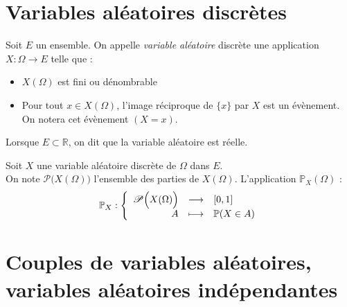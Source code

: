 \documentclass[11pt,a4paper,fleqn,pdftex]{report}
\begin{document}
\section{Variables aléatoires discrètes} %
\label{sec:variables_aleatoires_discretes}
\begin{dfn}
     Soit $E$ un ensemble. On appelle \emph{variable aléatoire} discrète une application $X : \Omega \to E$ telle que :
     \begin{itemize}
         \item $X(\Omega )$ est fini ou dénombrable
         \item Pour tout $x \in X(\Omega )$, l'image réciproque de $\lbrace x \rbrace$ par $X$ est un évènement. On notera cet évènement $(X= x)$.
     \end{itemize}
\end{dfn}
Lorsque $E\subset \mathbb{R}$, on dit que la variable aléatoire est réelle.
\begin{dfn}
     Soit $X$ une variable aléatoire discrète de $\Omega$ dans $E$.\\
     On note $\mathscr{P} \Big( X(\Omega ) \Big)$ l'ensemble des parties de $X(\Omega )$.
     L'application $\mathbb{P}_X (\Omega )$ : 
     \begin{equation}
      \mathbb{P}_X : \left\lbrace
      \begin{array}{r c l}
           \mathscr{P} \Big( X(\Omega ) \Big) &\longrightarrow & [0,1] \\
           A & \longmapsto & \mathbb{P} (X\in A)
      \end{array} \right.
      \end{equation}
\end{dfn}
\section[Couples de variables aléatoires]{Couples de variables aléatoires, variables aléatoires indépendantes} %
\label{sec:couples_de_variables_aleatoires}
\end{document}
